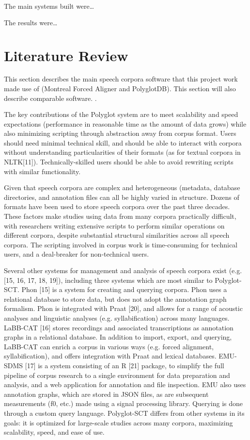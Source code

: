 \documentclass[11pt]{article}
\begin{document}
The main systems built were\ldots {}

The results were\ldots{}

\section{Literature Review}

This section describes the main speech corpora software that this project work made use of (Montreal Forced Aligner and PolyglotDB). This section will also describe comparable software. .

The key contributions of the Polyglot system are to meet scalability and speed expectations (performance in reasonable time as the amount of data grows) while also minimizing scripting through abstraction away from corpus format. Users should need minimal technical skill, and should be able to interact with corpora without understanding particularities of their formats (as for textual corpora in NLTK[11]). Technically-skilled users should be able to avoid rewriting scripts with similar functionality. 

Given that speech corpora are complex and heterogeneous (metadata, database directories, and annotation files can all be highly varied in structure. Dozens of formats have been used to store speech corpora over the past three decades. These factors make studies using data from many corpora practically difficult, with researchers writing extensive scripts to perform similar operations on different corpora, despite substantial structural similarities across all speech corpora. The scripting involved in corpus work is time-consuming for technical users, and a deal-breaker for non-technical users.

Several other systems for management and analysis of speech corpora exist (e.g. [15, 16, 17, 18, 19]), including three systems which are most similar to Polyglot-SCT. Phon [15] is a system for creating and querying corpora. Phon uses a relational database to store data, but does not adopt the annotation graph formalism. Phon is integrated with Praat [20], and allows for a range of acoustic analyses and linguistic analyses (e.g. syllabification) across many languages. LaBB-CAT [16] stores recordings and associated transcriptions as annotation graphs in a relational database. In addition to import, export, and querying, LaBB-CAT can enrich a corpus in various ways (e.g. forced alignment, syllabification), and offers integration with Praat and lexical databases. EMU-SDMS [17] is a system consisting of an R [21] package, to simplify the full pipeline of corpus research to a single environment for data preparation and analysis, and a web application for annotation and file inspection. EMU also uses annotation graphs, which are stored in JSON files, as are subsequent measurements (f0, etc.) made using a signal processing library. Querying is done through a custom query language. Polyglot-SCT differs from other systems in its goals: it is optimized for large-scale studies across many corpora, maximizing scalability, speed, and ease of use. 
\end{document}
